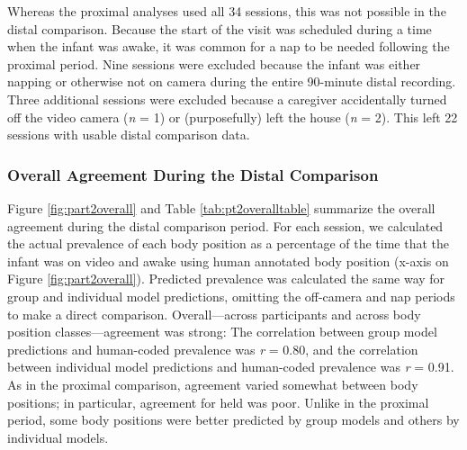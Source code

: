 \documentclass[
  man]{apa6}
\begin{document}
Whereas the proximal analyses used all 34 sessions, this was not possible in the distal comparison. Because the start of the visit was scheduled during a time when the infant was awake, it was common for a nap to be needed following the proximal period. Nine sessions were excluded because the infant was either napping or otherwise not on camera during the entire 90-minute distal recording. Three additional sessions were excluded because a caregiver accidentally turned off the video camera (\emph{n} = 1) or (purposefully) left the house (\emph{n} = 2). This left 22 sessions with usable distal comparison data.

\hypertarget{overall-agreement-during-the-distal-comparison}{%
\subsubsection{Overall Agreement During the Distal Comparison}\label{overall-agreement-during-the-distal-comparison}}

Figure \ref{fig:part2overall} and Table \ref{tab:pt2overalltable} summarize the overall agreement during the distal comparison period. For each session, we calculated the actual prevalence of each body position as a percentage of the time that the infant was on video and awake using human annotated body position (x-axis on Figure \ref{fig:part2overall}). Predicted prevalence was calculated the same way for group and individual model predictions, omitting the off-camera and nap periods to make a direct comparison. Overall---across participants and across body position classes---agreement was strong: The correlation between group model predictions and human-coded prevalence was \emph{r} = 0.80, and the correlation between individual model predictions and human-coded prevalence was \emph{r} = 0.91. As in the proximal comparison, agreement varied somewhat between body positions; in particular, agreement for held was poor. Unlike in the proximal period, some body positions were better predicted by group models and others by individual models.
\end{document}
